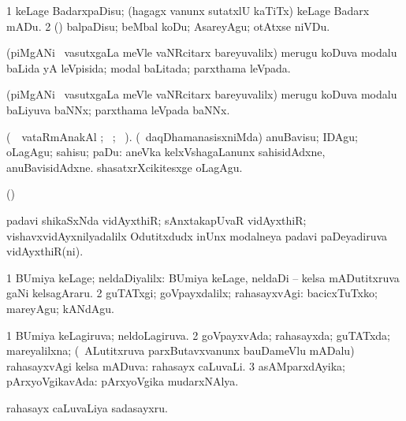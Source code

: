 {\bentry
{} 
\gl{\sakirx}
\expl{}
\bmng
\bnum
\num{1} keLage BadarxpaDisu; (hagagx \mo vanunx sutatxlU kaTiTx) keLage Badarx mADu. 
\num{2} (\rUpa) balpaDisu; beMbal koDu; AsareyAgu; otAtxse niVDu. 
\enum
\emng
\eentry

\bentry
{} 
\gl{\gu}
\expl{}
\bmng
 (piMgANi \mo\ vasutxgaLa meVle vaNRcitarx bareyuvalilx) merugu koDuva modalu baLida yA leVpisida; modal baLitada; parxthama leVpada. 
\emng
\eentry

\bentry
{} 
\gl{\nA}
\expl{}
\bmng
 (piMgANi \mo\ vasutxgaLa meVle vaNRcitarx bareyuvalilx) merugu koDuva modalu baLiyuva baNNx; parxthama leVpada baNNx. 
\emng
\eentry

\bentry
{} 
\gl{\sakirx}(\parxpu\ \Eva\ vataRmAnakAl ; \BU\
 ; \BUkaq\ ). \bmng
(\kanmu\ daqDhamanasisxniMda) anuBavisu; IDAgu; oLagAgu; sahisu; paDu:  aneVka kelxVshagaLanunx sahisidAdxne, anuBavisidAdxne.  shasatxrXcikitesxge oLagAgu. 
\emng
\eentry

\bentry
{} 
\gl{\nA}
\expl{}
\bmng
 (\AmA)  
\emng
\eentry

\bentry
{} 
\gl{\nA}
\expl{}
\bmng
 padavi shikaSxNda vidAyxthiR; sAnxtakapUvaR vidAyxthiR; vishavxvidAyxnilyadalilx Odutitxdudx inUnx modalneya padavi paDeyadiruva vidAyxthiR(ni). 
\emng
\eentry

\bentry
{} 
\gl{\kirxvi}
\expl{}
\bmng
\bnum
\num{1} BUmiya keLage; neldaDiyalilx:  BUmiya keLage, neldaDi -- kelsa mADutitxruva gaNi kelsagAraru. 
\num{2} guTATxgi; goVpayxdalilx; rahasayxvAgi: \eng{go underground} bacicxTuTxko; mareyAgu; kANdAgu. 
\enum
\emng
\eentry

\bentry
{} 
\gl{\gu}
\expl{}
\bmng
\bnum
\num{1} BUmiya keLagiruva; neldoLagiruva. 
\num{2} goVpayxvAda; rahasayxda; guTATxda; mareyalilxna; (\kanmu\ ALutitxruva parxButavxvanunx bauDameVlu mADalu) rahasayxvAgi kelsa mADuva:  rahasayx caLuvaLi. 
\num{3} asAMparxdAyika; pArxyoVgikavAda: \eng{underground press} pArxyoVgika mudarxNAlya. 
\enum
\emng

\noindent
\gl{\pagu}
\expl{}
\bmng
  rahasayx caLuvaLiya sadasayxru. 
\emng
\eentry

}
